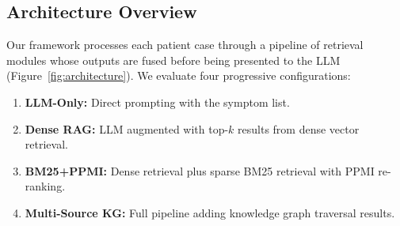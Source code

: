 \documentclass[runningheads]{llncs}
\begin{document}
\subsection{Architecture Overview}

Our framework processes each patient case through a pipeline of retrieval modules whose outputs are fused before being presented to the LLM (Figure~\ref{fig:architecture}). We evaluate four progressive configurations:

\begin{enumerate}
    \item \textbf{LLM-Only:} Direct prompting with the symptom list.
    \item \textbf{Dense RAG:} LLM augmented with top-$k$ results from dense vector retrieval.
    \item \textbf{BM25+PPMI:} Dense retrieval plus sparse BM25 retrieval with PPMI re-ranking.
    \item \textbf{Multi-Source KG:} Full pipeline adding knowledge graph traversal results.
\end{enumerate}
\end{document}
